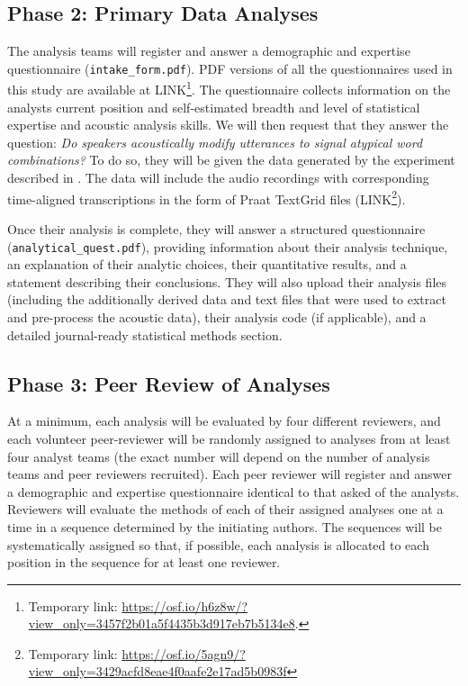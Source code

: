 \documentclass[
  12pt,
]{article}
\begin{document}
\hypertarget{phase-2-primary-data-analyses}{%
\subsection{Phase 2: Primary Data Analyses}\label{phase-2-primary-data-analyses}}

The analysis teams will register and answer a demographic and expertise questionnaire (\texttt{intake\_form.pdf}).
PDF versions of all the questionnaires used in this study are available at LINK\footnote{Temporary link: \url{https://osf.io/h6z8w/?view_only=3457f2b01a5f4435b3d917eb7b5134e8}.}.
The questionnaire collects information on the analysts current position and self-estimated breadth and level of statistical expertise and acoustic analysis skills.
We will then request that they answer the question: \emph{Do speakers acoustically modify utterances to signal atypical word combinations?}
To do so, they will be given the data generated by the experiment described in .
The data will include the audio recordings with corresponding time-aligned transcriptions in the form of Praat TextGrid files (LINK\footnote{Temporary link: \url{https://osf.io/5agn9/?view_only=3429acfd8eae4f0aafe2e17ad5b0983f}}).

Once their analysis is complete, they will answer a structured questionnaire (\texttt{analytical\_quest.pdf}), providing information about their analysis technique, an explanation of their analytic choices, their quantitative results, and a statement describing their conclusions.
They will also upload their analysis files (including the additionally derived data and text files that were used to extract and pre-process the acoustic data), their analysis code (if applicable), and a detailed journal-ready statistical methods section.

\hypertarget{phase-3-peer-review-of-analyses}{%
\subsection{Phase 3: Peer Review of Analyses}\label{phase-3-peer-review-of-analyses}}

At a minimum, each analysis will be evaluated by four different reviewers, and each volunteer peer-reviewer will be randomly assigned to analyses from at least four analyst teams (the exact number will depend on the number of analysis teams and peer reviewers recruited).
Each peer reviewer will register and answer a demographic and expertise questionnaire identical to that asked of the analysts.
Reviewers will evaluate the methods of each of their assigned analyses one at a time in a sequence determined by the initiating authors.
The sequences will be systematically assigned so that, if possible, each analysis is allocated to each position in the sequence for at least one reviewer.
\end{document}
